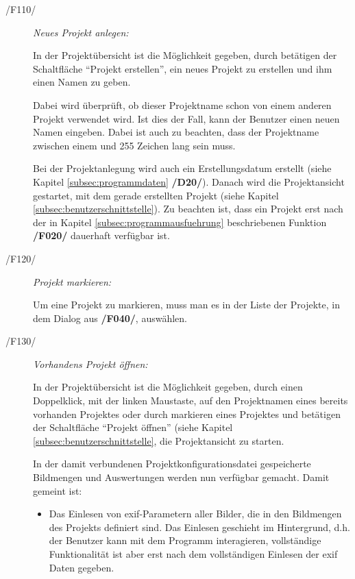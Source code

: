 	\begin{description}		
		
		\item[/F110/] \textit{Neues Projekt anlegen:}\par In der Projektübersicht ist die Möglichkeit gegeben, durch betätigen der Schaltfläche "`Projekt erstellen"', ein neues Projekt zu erstellen und ihm einen Namen zu geben.\par Dabei wird überprüft, ob dieser Projektname schon von einem anderen Projekt verwendet wird. Ist dies der Fall, kann der Benutzer einen neuen Namen eingeben. Dabei ist auch zu beachten, dass der Projektname zwischen einem und 255 Zeichen lang sein muss.\par Bei der Projektanlegung wird auch ein Erstellungsdatum erstellt (siehe Kapitel \ref{subsec:programmdaten} \textbf{/D20/}). Danach wird die Projektansicht gestartet, mit dem gerade erstellten Projekt (siehe Kapitel \ref{subsec:benutzerschnittstelle}). Zu beachten ist, dass ein Projekt erst nach der in Kapitel \ref{subsec:programmausfuehrung} beschriebenen Funktion \textbf{/F020/} dauerhaft verfügbar ist. 
		
		\item[/F120/] \textit{Projekt markieren:}\par Um eine Projekt zu markieren, muss man es in der Liste der Projekte, in dem Dialog aus \textbf{/F040/}, auswählen.
		
		\item[/F130/] \textit{Vorhandens Projekt öffnen:}\par In der Projektübersicht ist die Möglichkeit gegeben, durch einen Doppelklick, mit der linken Maustaste, auf den Projektnamen eines bereits vorhanden Projektes oder durch markieren eines Projektes und betätigen der Schaltfläche "`Projekt öffnen"' (siehe Kapitel \ref{subsec:benutzerschnittstelle}, die Projektansicht zu starten.\par In der damit verbundenen Projektkonfigurationsdatei gespeicherte Bildmengen und Auswertungen werden nun verfügbar gemacht. Damit gemeint ist: 
			
			\begin{itemize}
				
				\item Das Einlesen von \gls{exif}-Parametern aller Bilder, die in den Bildmengen des Projekts definiert sind. Das Einlesen geschieht im Hintergrund, d.h. der Benutzer kann mit dem Programm interagieren, vollständige Funktionalität ist aber erst nach dem vollständigen Einlesen der \gls{exif} Daten gegeben.
				

\end{itemize}
\end{description}
